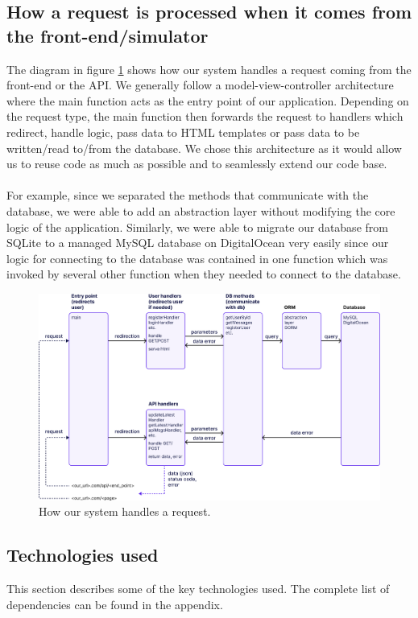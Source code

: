 \documentclass{article}
\begin{document}
\subsection{How a request is processed when it comes from the front-end/simulator}
The diagram in figure \ref{fig:request_pipeline} shows how our system handles a request coming from the front-end or the API. We generally follow a model-view-controller architecture where the main function acts as the entry point of our application. Depending on the request type, the main function then forwards the request to handlers which redirect, handle logic, pass data to HTML templates or pass data to be written/read to/from the database. We chose this architecture as it would allow us to reuse code as much as possible and to seamlessly extend our code base. 
\\\\
For example, since we separated the methods that communicate with the database, we were able to add an abstraction layer without modifying the core logic of the application. Similarly, we were able to migrate our database from SQLite to a managed MySQL database on DigitalOcean very easily since our logic for connecting to the database was contained in one function which was invoked by several other function when they needed to connect to the database.

\begin{figure}[ht]
    \centering
    \includegraphics[width=1.0\textwidth]{./images/request_pipeline_v2.png}
    \caption{How our system handles a request.}
    \label{fig:request_pipeline}
\end{figure}

\subsection{Technologies used}
This section describes some of the key technologies used. The complete list of dependencies can be found in the appendix.
\end{document}
